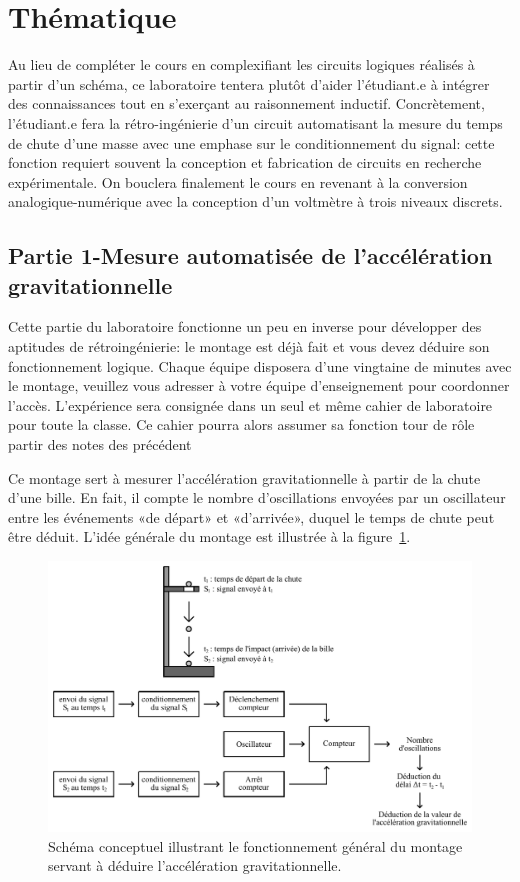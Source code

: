 \section{Thématique}\label{sec:objectifs}
\vspace{-2ex}

Au lieu de compléter le cours en complexifiant les circuits logiques réalisés à partir d’un schéma, ce laboratoire tentera plutôt d’aider l’étudiant.e à intégrer des connaissances tout en s’exerçant au raisonnement inductif. Concrètement, l’étudiant.e fera la rétro-ingénierie d’un circuit automatisant la mesure du temps de chute d’une masse avec une emphase sur le conditionnement du signal: cette fonction requiert souvent la conception et fabrication de circuits en recherche expérimentale. On bouclera finalement le cours en revenant à la conversion analogique-numérique avec la conception d’un voltmètre à trois niveaux discrets.

\subsection{Partie 1-Mesure automatisée de l'accélération gravitationnelle}

Cette partie du laboratoire fonctionne un peu en inverse pour développer des aptitudes de rétroingénierie: le montage est déjà fait et vous devez déduire son fonctionnement logique. Chaque équipe disposera d'une vingtaine de minutes avec le montage, veuillez vous adresser à votre équipe d'enseignement pour coordonner l'accès. L'expérience sera consignée dans un seul et même cahier de laboratoire pour toute la classe. Ce cahier pourra alors assumer sa fonction 
tour de rôle partir des notes des précédent


Ce montage sert à mesurer l'accélération gravitationnelle à partir de la chute d'une bille. En fait, il compte le nombre d'oscillations envoyées par un oscillateur entre les événements «de départ» et «d'arrivée», duquel le temps de chute peut être déduit. L'idée générale du montage est illustrée à la figure~\ref{fig:calcul-g}.
\begin{figure}[h]
\centering
\includegraphics[width=\textwidth]{SchemaFonct-calcul-g}
\caption{\label{fig:calcul-g}Schéma conceptuel illustrant le fonctionnement général du montage servant à déduire l'accélération gravitationnelle.}
\end{figure}


